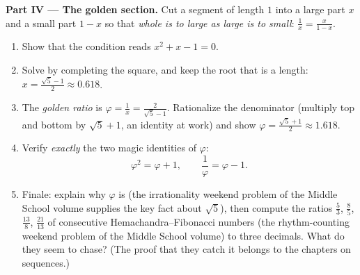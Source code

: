 \begin{problem}[{Weekend problem --- sum-and-product problems,
completing the square the way al-Khwarizmi drew it, and the
equation $x^2 = x + 1$}]
\medskip
\noindent\textbf{Part IV --- The golden section.}
Cut a segment of length $1$ into a large part $x$ and a small
part $1 - x$ so that
\emph{whole is to large as large is to small}:
$\frac{1}{x} = \frac{x}{1 - x}$.
\begin{enumerate}[resume]
  \item Show that the condition reads $x^2 + x - 1 = 0$.
  \item Solve by completing the square, and keep the root that
        is a length: $x = \frac{\sqrt5 - 1}{2} \approx 0.618$.
  \item The \emph{golden ratio} is
        $\varphi = \frac1x = \frac{2}{\sqrt5 - 1}$. Rationalize
        the denominator (multiply top and bottom by
        $\sqrt5 + 1$, an identity at work) and show
        $\varphi = \frac{\sqrt5 + 1}{2} \approx 1.618$.
  \item Verify \emph{exactly} the two magic identities of
        $\varphi$:
        \[
        \varphi^2 = \varphi + 1,
        \qquad
        \frac{1}{\varphi} = \varphi - 1 .
        \]
  \item Finale: explain why $\varphi$ is 
        (the irrationality weekend problem of the Middle School volume supplies the key fact about
        $\sqrt5$), then compute the ratios $\frac53$,
        $\frac85$, $\frac{13}{8}$, $\frac{21}{13}$ of
        consecutive Hemachandra--Fibonacci numbers
        (the rhythm-counting weekend problem of the Middle School volume) to three decimals. What do
        they seem to chase? (The proof that they catch it
        belongs to the chapters on sequences.)
\end{enumerate}
\end{problem}
